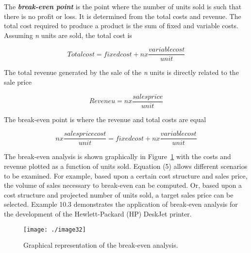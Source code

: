 The \emph{\textbf{break-even point}} is the point where the number of
units sold is such that there is no profit or loss. It is determined
from the total costs and revenue. The total cost required to produce a
product is the sum of fixed and variable costs. Assuming \emph{n} units
are sold, the total cost is

\begin{equation}
\label{equ:totalCost}
Total cost = fixed cost + n x\frac{variable cost}{unit}
\end{equation}

The total revenue generated by the sale of the \emph{n} units is
directly related to the sale price

\begin{equation}
\label{equ:Revenue}
Reveneu = n x\frac{sales price}{unit}
\end{equation}

The break-even point is where the revenue and total costs are equal

\begin{equation}
\label{equ:breakEven}
n x \frac{sales price cost}{unit} = fixed cost + n x \frac{variable cost}{unit}
\end{equation}

The break-even analysis is shown graphically in 
Figure~\ref{figure:breakEvenGraph} with the
costs and revenue plotted as a function of units sold. Equation (5)
allows different scenarios to be examined. For example, based upon a
certain cost structure and sales price, the volume of sales necessary to
break-even can be computed. Or, based upon a cost structure and
projected number of units sold, a target sales price can be selected.
Example 10.3 demonstrates the application of break-even analysis for the
development of the Hewlett-Packard (HP) DeskJet printer.

\begin{figure}
\texttt{[image: ./image32]}
\caption{Graphical representation of the break-even
analysis.}
\label{figure:breakEvenGraph}
\end{figure}



